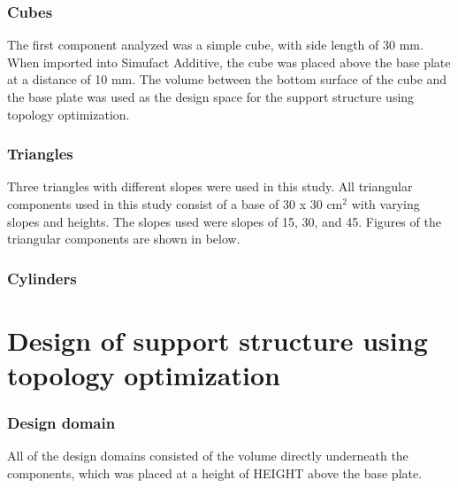 \documentclass{article}
\begin{document}
\subsubsection{Cubes}

The first component analyzed was a simple cube, with side length of 30 mm. When imported into Simufact Additive, the cube was placed above the base plate at a distance of 10 mm. The volume between the bottom surface of the cube and the base plate was used as the design space for the support structure using topology optimization.


\subsubsection{Triangles}

Three triangles with different slopes were used in this study. All triangular components used in this study consist of a base of 30 x 30 cm$^{2}$ with varying slopes and heights. The slopes used were slopes of 15\degree, 30\degree, and 45\degree. Figures of the triangular components are shown in  below.


\subsubsection{Cylinders}


\section{Design of support structure using topology optimization}



\subsubsection{Design domain}


All of the design domains consisted of the volume directly underneath the components, which was
placed at a height of HEIGHT above the base plate.
\end{document}
